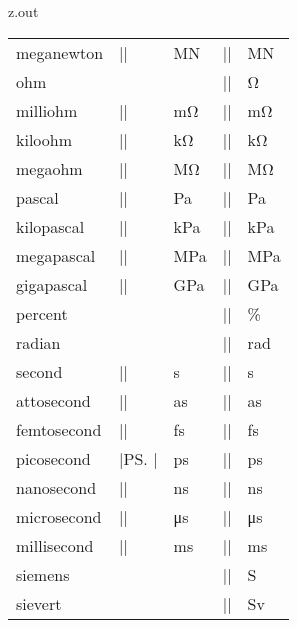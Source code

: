 \begin{VerbatimOut}{z.out}
{\begin{longtable}{@{}lllll@{}}
    \q meganewton&        |\MN|&   \unit{\MN}&   |\mega\newton|&        \unit{\mega\newton}\\[6pt]
    ohm&                  &        &             |\ohm|&                \unit{\ohm}\\
    \q milliohm&          |\mohm|& \unit{\mohm}& |\milli\ohm|&          \unit{\milli\ohm}\\
    \q kiloohm&           |\kohm|& \unit{\kohm}& |\kilo\ohm|&           \unit{\kilo\ohm}\\
    \q megaohm&           |\Mohm|& \unit{\Mohm}& |\mega\ohm|&           \unit{\mega\ohm}\\[6pt]
    pascal&               |\Pa|&   \unit{\Pa}&   |\pascal|&             \unit{\pascal}\\
    \q kilopascal&        |\kPa|&  \unit{\kPa}&  |\kilo\pascal|&        \unit{\kilo\pascal}\\
    \q megapascal&        |\MPa|&  \unit{\MPa}&  |\mega\pascal|&        \unit{\mega\pascal}\\
    \q gigapascal&        |\GPa|&  \unit{\GPa}&  |\giga\pascal|&        \unit{\giga\pascal}\\[6pt]
    percent&              &        &             |\percent|&            \unit{\percent}\\[6pt]
    radian&               &        &             |\radian|&             \unit{\radian}\\[6pt]
    second&               |\s|&    \unit{\s}&    |\second|&             \unit{\second}\\
    \q attosecond&        |\as|&   \unit{\as}&   |\atto\second|&        \unit{\as}\\
    \q femtosecond&       |\fs|&   \unit{\fs}&   |\femto\second|&       \unit{\fs}\\
    \q picosecond&        |\ps|&   \unit{\ps}&   |\pico\second|&        \unit{\ps}\\
    \q nanosecond&        |\ns|&   \unit{\ns}&   |\nano\second|&        \unit{\ns}\\
    \q microsecond&       |\us|&   \unit{\us}&   |\micro\second|&       \unit{\us}\\
    \q millisecond&       |\ms|&   \unit{\ms}&   |\milli\second|&       \unit{\ms}\\[6pt]
    siemens&              &        &             |\siemens|&            \unit{\siemens}\\[6pt]
    sievert&              &        &             |\sievert|&            \unit{\sievert}\\[6pt]

\end{longtable}}
\end{VerbatimOut}
